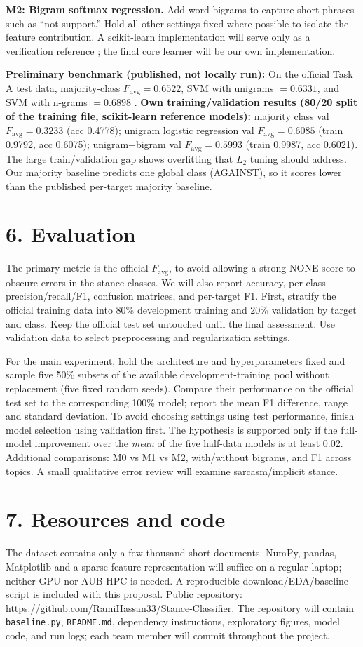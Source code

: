 \documentclass[9pt,twocolumn]{extarticle}
\begin{document}
\textbf{M2: Bigram softmax regression.} Add word bigrams to capture short phrases such as ``not support.'' Hold all other settings fixed where possible to isolate the feature contribution. A scikit-learn implementation will serve only as a verification reference \cite{pedregosa2011}; the final core learner will be our own implementation.

\textbf{Preliminary benchmark (published, not locally run):} On the official Task A test data, majority-class $F_{\mathrm{avg}}=0.6522$, SVM with unigrams $=0.6331$, and SVM with n-grams $=0.6898$ \cite{mohammad2016}. \textbf{Own training/validation results (80/20 split of the training file, scikit-learn reference models):} majority class val $F_{\mathrm{avg}}=0.3233$ (acc 0.4778); unigram logistic regression val $F_{\mathrm{avg}}=0.6085$ (train 0.9792, acc 0.6075); unigram+bigram val $F_{\mathrm{avg}}=0.5993$ (train 0.9987, acc 0.6021). The large train/validation gap shows overfitting that $L_2$ tuning should address. Our majority baseline predicts one global class (AGAINST), so it scores lower than the published per-target majority baseline.
\section*{6. Evaluation}
The primary metric is the official $F_{\mathrm{avg}}$, to avoid allowing a strong NONE score to obscure errors in the stance classes. We will also report accuracy, per-class precision/recall/F1, confusion matrices, and per-target F1. First, stratify the official training data into 80\% development training and 20\% validation by target and class. Keep the official test set untouched until the final assessment. Use validation data to select preprocessing and regularization settings.

For the main experiment, hold the architecture and hyperparameters fixed and sample five 50\% subsets of the available development-training pool without replacement (five fixed random seeds). Compare their performance on the official test set to the corresponding 100\% model; report the mean F1 difference, range and standard deviation. To avoid choosing settings using test performance, finish model selection using validation first. The hypothesis is supported only if the full-model improvement over the \emph{mean} of the five half-data models is at least 0.02. Additional comparisons: M0 vs M1 vs M2, with/without bigrams, and F1 across topics. A small qualitative error review will examine sarcasm/implicit stance.
\section*{7. Resources and code}
The dataset contains only a few thousand short documents. NumPy, pandas, Matplotlib and a sparse feature representation will suffice on a regular laptop; neither GPU nor AUB HPC is needed. A reproducible download/EDA/baseline script is included with this proposal. Public repository: \url{https://github.com/RamiHassan33/Stance-Classifier}. The repository will contain \texttt{baseline.py}, \texttt{README.md}, dependency instructions, exploratory figures, model code, and run logs; each team member will commit throughout the project.
\end{document}
